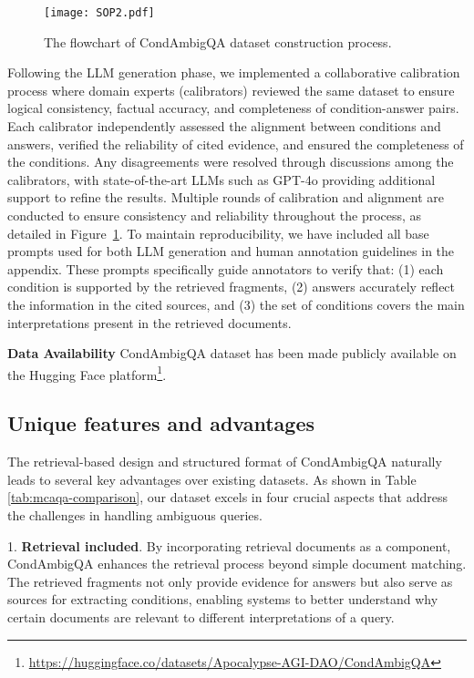 \begin{figure}[h]
\centering
\texttt{[image: SOP2.pdf]}
\caption{The flowchart of CondAmbigQA dataset construction process.}
\label{alg:annotation_process}
\end{figure}

Following the LLM generation phase, we implemented a collaborative calibration process where domain experts (calibrators) reviewed the same dataset to ensure logical consistency, factual accuracy, and completeness of condition-answer pairs. Each calibrator independently assessed the alignment between conditions and answers, verified the reliability of cited evidence, and ensured the completeness of the conditions. Any disagreements were resolved through discussions among the calibrators, with state-of-the-art LLMs such as GPT-4o providing additional support to refine the results. Multiple rounds of calibration and alignment are conducted to ensure consistency and reliability throughout the process, as detailed in Figure~\ref{alg:annotation_process}.
To maintain reproducibility, we have included all base prompts used for both LLM generation and human annotation guidelines in the appendix. These prompts specifically guide annotators to verify that: (1) each condition is supported by the retrieved fragments, (2) answers accurately reflect the information in the cited sources, and (3) the set of conditions covers the main interpretations present in the retrieved documents.


\textbf{Data Availability}  CondAmbigQA dataset has been made publicly available on the Hugging Face platform\footnote{\url{https://huggingface.co/datasets/Apocalypse-AGI-DAO/CondAmbigQA}}.

\subsection{Unique features and advantages}

The retrieval-based design and structured format of CondAmbigQA naturally leads to several key advantages over existing datasets. As shown in Table \ref{tab:mcaqa-comparison}, our dataset excels in four crucial aspects that address the challenges in handling ambiguous queries.

1. \textbf{Retrieval included}. By incorporating retrieval documents as a component, CondAmbigQA enhances the retrieval process beyond simple document matching. The retrieved fragments not only provide evidence for answers but also serve as sources for extracting conditions, enabling systems to better understand why certain documents are relevant to different interpretations of a query.

